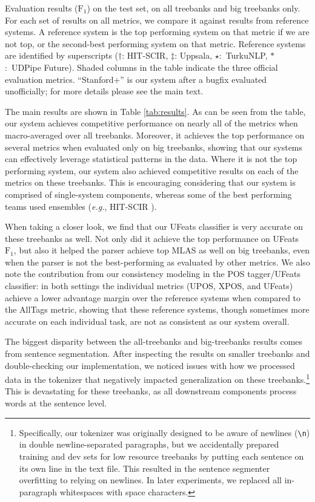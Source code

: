 \documentclass[11pt,a4paper]{article}
\newcommand{\fone}{$\text{F}_1$}
\begin{document}
\begin{table*}
\caption{Evaluation results (\fone{}) on the test set, on all treebanks and big treebanks only. For each set of results on all metrics, we compare it against results from reference systems. A reference system is the top performing system on that metric if we are not top, or the second-best performing system on that metric. Reference systems are identified by superscripts ($\dagger$: HIT-SCIR, $\ddagger$: Uppsala, $\star$:~TurkuNLP, $*$:~UDPipe Future). Shaded columns in the table indicate the three official evaluation metrics. ``Stanford+'' is our system after a bugfix evaluated unofficially; for more details please see the main text.} \label{tab:results}
\end{table*}

The main results are shown in Table \ref{tab:results}.
As can be seen from the table, our system achieves competitive performance on nearly all of the metrics when macro-averaged over all treebanks.
Moreover, it achieves the top performance on several metrics when evaluated only on big treebanks, showing that our systems can effectively leverage statistical patterns in the data.
Where it is not the top performing system, our system also achieved competitive results on each of the metrics on these treebanks.
This is encouraging considering that our system is comprised of single-system components, whereas some of the best performing teams used ensembles (\emph{e.g.}, HIT-SCIR \cite{che18towards}).

When taking a closer look, we find that our UFeats classifier is very accurate on these treebanks as well.
Not only did it achieve the top performance on UFeats \fone, but also it helped the parser achieve top MLAS as well on big treebanks, even when the parser is not the best-performing as evaluated by other metrics.
We also note the contribution from our consistency modeling in the POS tagger/UFeats classifier: in both settings the individual metrics (UPOS, XPOS, and UFeats) achieve a lower advantage margin over the reference systems when compared to the AllTags metric, showing that these reference systems, though sometimes more accurate on each individual task, are not as consistent as our system overall.

The biggest disparity between the all-treebanks and big-treebanks results comes from sentence segmentation.
After inspecting the results on smaller treebanks and double-checking our implementation, we noticed issues with how we processed data in the tokenizer that negatively impacted generalization on these treebanks.\footnote{Specifically, our tokenizer was originally designed to be aware of newlines (\texttt{\textbackslash{}n}) in double newline-separated paragraphs, but we accidentally prepared training and dev sets for low resource treebanks by putting each sentence on its own line in the text file.
This resulted in the sentence segmenter overfitting to relying on newlines. In later experiments, we replaced all in-paragraph whitespaces with space characters.}
This is devastating for these treebanks, as all downstream components process words at the sentence level.
\end{document}

